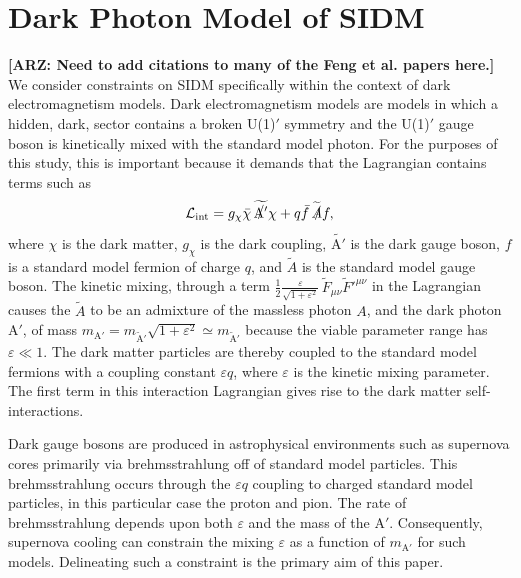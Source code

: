 \documentclass[nofootinbib,prd,superscriptaddress,twocolumn]{revtex4}
\newcommand{\Aprime}{\mathrm{A}'}
\newcommand{\arz}[1]{{{\bf{\color{BrickRed}[ARZ: #1]}}}}
\begin{document}
\section{Dark Photon Model of SIDM}
\label{section:model}

\arz{Need to add citations to many of the Feng et al. papers here.}
We consider constraints on SIDM specifically within the context of dark electromagnetism models. 
Dark electromagnetism models are models in which a hidden, dark, sector contains a broken U(1)$'$ 
symmetry and the U(1)$'$ gauge boson is kinetically mixed with the standard model photon. For the 
purposes of this study, this is important because it demands that the Lagrangian contains terms such as 
%
\begin{equation}
\mathcal{L}_{\mathrm{int}} = g_{\chi} \bar{\chi} \, \widetilde{\slashed{\Aprime}} \chi + q \bar{f}\, \widetilde{\slashed{A}} f, 
\end{equation}
%
where $\chi$ is the dark matter, $g_{\chi}$ is the dark coupling, $\widetilde{\Aprime}$ is the dark gauge boson, 
$f$ is a standard model fermion of charge $q$, and $\widetilde{A}$ is the standard model gauge boson. 
The kinetic mixing, through a term 
$\frac{1}{2}\frac{\varepsilon}{\sqrt{1+\varepsilon^2}}\, \widetilde{F}_{\mu \nu}\widetilde{F}'^{\mu \nu}$ 
in the Lagrangian causes the $\widetilde{A}$ to be an admixture of the massless photon $A$, 
and the dark photon $\Aprime$, 
of mass $m_{\mathrm{\Aprime}} = m_{\mathrm{\widetilde{A}'}} \sqrt{1 + \varepsilon^2} \simeq m_\mathrm{{\widetilde{A}'}}$ because 
the viable parameter range has $\varepsilon \ll 1$. The dark matter particles are thereby coupled 
to the standard model fermions with a coupling constant $\varepsilon q$, 
where $\varepsilon$ is the kinetic mixing parameter. The first term in this 
interaction Lagrangian gives rise to the dark matter self-interactions. 

Dark gauge bosons are produced in astrophysical environments such as supernova 
cores primarily via brehmsstrahlung off of standard model particles. This brehmsstrahlung 
occurs through the $\varepsilon q$ coupling to charged standard model particles, 
in this  particular case the proton and pion. The rate of brehmsstrahlung 
depends upon both $\varepsilon$ and the mass of the $\Aprime$. Consequently, 
supernova cooling can constrain the mixing $\varepsilon$ as a function of 
$m_{\Aprime}$ for such models. Delineating such a constraint is the 
primary aim of this paper.


\end{document}
